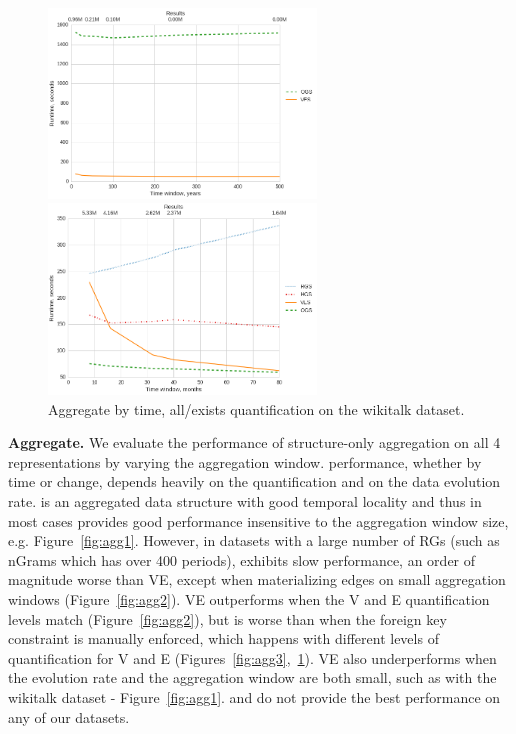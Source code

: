 \begin{figure}
\centering
\begin{minipage}{3.3in}
\centering
\includegraphics[width=2.8in]{figs/agg_allexists_ngrams_vertices_build11.png}
\caption{Aggregate by time, all/exists quantification on the nGrams dataset.}
\label{fig:agg3}
\end{minipage}
\begin{minipage}{3.3in}
\centering
\includegraphics[width=2.8in]{figs/agg_allexists_wikitalk_edges_build11.png}
\caption{Aggregate by time, all/exists quantification on the wikitalk dataset.}
\label{fig:agg4}
\end{minipage}
\end{figure}

{\bf Aggregate.}  We evaluate the performance of structure-only
aggregation on all 4 representations by varying the aggregation
window.   performance, whether by time or change,
depends heavily on the quantification and on the data evolution rate.
\og is an aggregated data structure with good temporal locality and
thus in most cases provides good performance insensitive to the
aggregation window size, e.g. Figure~\ref{fig:agg1}.  However, in
datasets with a large number of RGs (such as nGrams which has over 400
periods), \og exhibits slow performance, an order of magnitude worse
than VE, except when materializing edges on small aggregation windows
(Figure~\ref{fig:agg2}).  VE outperforms \og when the V and E
quantification levels match (Figure~\ref{fig:agg2}), but is worse than
\og when the foreign key constraint is manually enforced, which
happens with different levels of quantification for V and E
(Figures~\ref{fig:agg3},~\ref{fig:agg4}).  VE also underperforms \og
when the evolution rate and the aggregation window are both small,
such as with the wikitalk dataset - Figure~\ref{fig:agg1}.  \sg and
\hg do not provide the best performance on any of our datasets.

